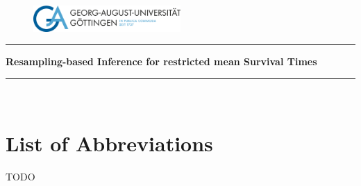 
\thispagestyle{empty}

\vspace*{\fill}
\begin{center}

\begin{figure}[htbp]
  \centering
  \includegraphics[width=0.5\textwidth]{assets/uni-goe-logo.png}
\end{figure}

\rule{\linewidth}{0.5mm}

{\Large \textbf{Resampling-based Inference for restricted mean Survival Times}}

\rule{\linewidth}{0.5mm} \\

\end{center}

\vspace*{\fill}



\newpage
{}

{
\setcounter{tocdepth}{3}
\tableofcontents
}
\newpage


\listoffigures

\listoftables

\section*{List of Abbreviations}

TODO
